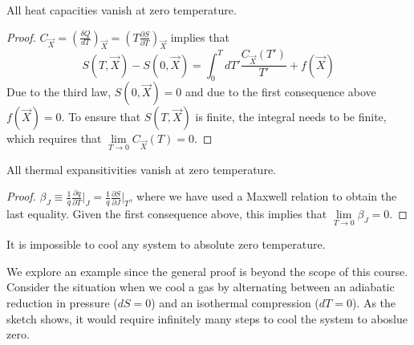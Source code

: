 \documentclass[12pt, a4paper, oneside, openright, titlepage]{book}
\begin{document}
\begin{cor}
    All heat capacities vanish at zero temperature.
\end{cor}
\begin{proof}
    $C_{\vec{X}} = \left(\frac{\delta Q}{dT}\right)_{\vec{X}} = \left(T\frac{\partial S}{\partial T}\right)_{\vec{X}}$ implies that $$S(T,\vec{X}) - S(0,\vec{X}) = \int_0^TdT'\frac{C_{\vec{X}}(T')}{T'} + f(\vec{X})$$ Due to the third law, $S(0,\vec{X}) = 0$ and due to the first consequence above $f(\vec{X}) = 0$. To ensure that $S(T,\vec{X})$ is finite, the integral needs to be finite, which requires that $\lim\limits_{T\rightarrow 0}C_{\vec{X}}(T) = 0$.
\end{proof}

\begin{cor}
    All thermal expansitivities vanish at zero temperature.
\end{cor}
\begin{proof}
    $\beta_J \equiv \frac{1}{q}\frac{\partial q}{\partial T}\Bigg\rvert_{J} = \frac{1}{q}\frac{\partial S}{\partial J}\Bigg\rvert_T$, where we have used a Maxwell relation to obtain the last equality. Given the first consequence above, this implies that $\lim\limits_{T\rightarrow 0}\beta_J = 0$.
\end{proof}

\begin{cor}
    It is impossible to cool any system to absolute zero temperature.
\end{cor}

We explore an example since the general proof is beyond the scope of this course. Consider the situation when we cool a gas by alternating between an adiabatic reduction in pressure ($dS = 0$) and an isothermal compression ($dT = 0$). As the sketch shows, it would require infinitely many steps to cool the system to aboslue zero.
\end{document}
